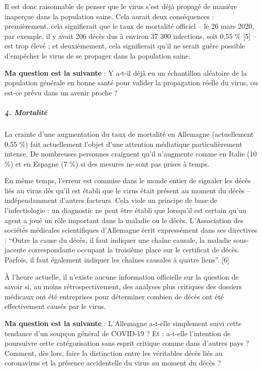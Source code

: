 Il est donc raisonnable de penser que le virus s'est déjà propagé de
manière inaperçue dans la population saine. Cela aurait deux
conséquences : premièrement, cela signifierait que le taux de mortalité
officiel -- le 26 mars 2020, par exemple, il y avait 206 décès dus à
environ 37 300 infections, soit 0,55 \% {[}5{]} -- est trop élevé ; et
deuxièmement, cela signifierait qu'il ne serait guère possible
d'empêcher le virus de se propager dans la population saine.

\textbf{Ma question est la suivante} : Y a-t-il déjà eu un échantillon
aléatoire de la population générale en bonne santé pour valider la
propagation réelle du virus, ou est-ce prévu dans un avenir proche ?

\hypertarget{4-mortalituxe9}{%
\subparagraph{\texorpdfstring{\textbf{4.
Mortalité}}{4. Mortalité}}\label{4-mortalituxe9}}

La crainte d'une augmentation du taux de mortalité en Allemagne
(actuellement 0,55 \%) fait actuellement l'objet d'une attention
médiatique particulièrement intense. De nombreuses personnes craignent
qu'il n'augmente comme en Italie (10 \%) et en Espagne (7 \%) si des
mesures ne sont pas prises à temps.

En même temps, l'erreur est commise dans le monde entier de signaler les
décès liés au virus dès qu'il est établi que le virus était présent au
moment du décès -- indépendamment d'autres facteurs. Cela viole un
principe de base de l'infectiologie : un diagnostic ne peut être établi
que lorsqu'il est certain qu'un agent a joué un rôle important dans la
maladie ou le décès. L'Association des sociétés médicales scientifiques
d'Allemagne écrit expressément dans ses directives : ``Outre la cause du
décès, il faut indiquer une chaîne causale, la maladie sous-jacente
correspondante occupant la troisième place sur le certificat de décès.
Parfois, il faut également indiquer les chaînes causales à quatre
liens''. {[}6{]}

À l'heure actuelle, il n'existe aucune information officielle sur la
question de savoir si, au moins rétrospectivement, des analyses plus
critiques des dossiers médicaux ont été entreprises pour déterminer
combien de décès ont été effectivement causés par le virus.

\textbf{Ma question est la suivante} : L'Allemagne a-t-elle simplement
suivi cette tendance d'un soupçon général de COVID-19 ? Et : a-t-elle
l'intention de poursuivre cette catégorisation sans esprit critique
comme dans d'autres pays ? Comment, dès lors, faire la distinction entre
les véritables décès liés au coronavirus et la présence accidentelle du
virus au moment du décès ?

